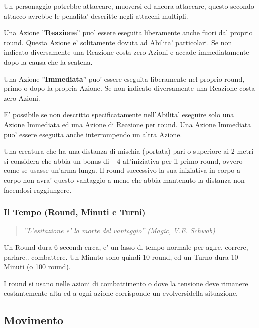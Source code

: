 \documentclass[a4paper,11pt,twoside,openany]{book}
\begin{document}
Un personaggio potrebbe attaccare, muoversi ed ancora attaccare, questo secondo attacco avrebbe le penalita' descritte negli attacchi multipli.
\smallskip

Una Azione ''\textbf{Reazione}'' puo' essere eseguita liberamente anche fuori dal proprio round. Questa Azione e' solitamente dovuta ad Abilita' particolari. Se non indicato diversamente una Reazione costa zero Azioni e accade immediatamente dopo la causa che la scatena.
\smallskip

Una Azione ''\textbf{Immediata}'' puo' essere eseguita liberamente nel proprio round, primo o dopo la propria Azione. Se non indicato diversamente una Reazione costa zero Azioni.

E' possibile se non descritto specificatamente nell'Abilita' eseguire solo una Azione Immediata ed una Azione di Reazione per round. Una Azione Immediata puo' essere eseguita anche interrompendo un altra Azione.

Una creatura che ha una distanza di mischia (portata) pari o superiore
ai 2 metri si considera che abbia un bonus di +4 all'iniziativa per
il primo round, ovvero come se usasse un'arma lunga. Il round successivo
la sua iniziativa in corpo a corpo non avra' questo vantaggio a meno
che abbia mantenuto la distanza non facendosi raggiungere.

\subsubsection{Il Tempo (Round, Minuti e Turni)}

\label{il-tempo-round-minuti-e-turni}
\begin{quote}\textit{
''L'esitazione e' la morte del vantaggio'' (Magic, V.E. Schwab)
}\end{quote}

Un Round dura 6 secondi circa, e' un lasso di tempo normale per agire, correre, parlare.. combattere. Un Minuto sono quindi 10 round, ed un Turno dura 10 Minuti (o 100 round).

I round si usano nelle azioni di combattimento o dove la tensione deve rimanere costantemente alta ed a ogni azione corrisponde un evolversidella situazione.

\pagebreak

\subsection{Movimento}
\end{document}
